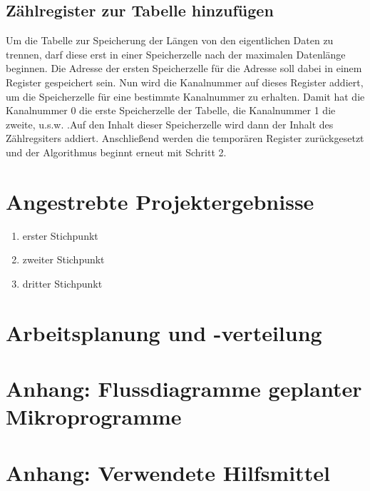 \documentclass[12pt,titlepage,german,a4]{article}
\begin{document}
    \subsection{Z{\"a}hlregister zur Tabelle hinzuf{\"u}gen}
    Um die Tabelle zur Speicherung der L{\"a}ngen von den eigentlichen Daten zu trennen, darf diese erst in einer Speicherzelle nach der maximalen Datenl{\"a}nge beginnen. Die Adresse der ersten Speicherzelle f{\"u}r die Adresse soll dabei in einem Register gespeichert sein. Nun wird die Kanalnummer auf dieses Register addiert, um die Speicherzelle f{\"u}r eine bestimmte Kanalnummer zu erhalten. Damit hat die Kanalnummer 0 die erste Speicherzelle der Tabelle, die Kanalnummer 1 die zweite, u.s.w. .Auf den Inhalt dieser Speicherzelle wird dann der Inhalt des Z{\"a}hlregsiters addiert. Anschließend werden die tempor{\"a}ren Register zur{\"u}ckgesetzt und der Algorithmus beginnt erneut mit Schritt 2.



    \section{Angestrebte Projektergebnisse}
        \begin{enumerate}
            \item erster Stichpunkt
            \item zweiter Stichpunkt
            \item dritter Stichpunkt
        \end{enumerate}
    \section{Arbeitsplanung und -verteilung}

    \section{Anhang: Flussdiagramme geplanter Mikroprogramme}

    \section{Anhang: Verwendete Hilfsmittel}
\end{document}
